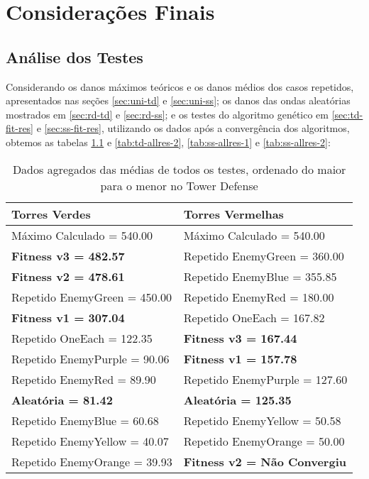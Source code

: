 \chapter{Considerações Finais}
\label{cap:consideracoes}

\section{Análise dos Testes}
\label{sec:analise-testes}

Considerando os danos máximos teóricos e os danos médios dos casos repetidos, apresentados nas seções \ref{sec:uni-td} e \ref{sec:uni-ss}; os danos das ondas aleatórias mostrados em \ref{sec:rd-td} e \ref{sec:rd-ss}; e os testes do algoritmo genético em \ref{sec:td-fit-res} e \ref{sec:ss-fit-res}, utilizando os dados após a convergência dos algoritmos, obtemos as tabelas \ref{tab:td-allres-1} e \ref{tab:td-allres-2}, \ref{tab:ss-allres-1} e \ref{tab:ss-allres-2}:

\pagebreak

\begin{table}[H]
\centering
\begin{tabular}{l|l}
Torres Verdes                & Torres Vermelhas                    \\ \hline
Máximo Calculado = 540.00    & Máximo Calculado = 540.00           \\
\textbf{Fitness v3 = 482.57} & Repetido EnemyGreen = 360.00        \\
\textbf{Fitness v2 = 478.61} & Repetido EnemyBlue = 355.85         \\
Repetido EnemyGreen = 450.00 & Repetido EnemyRed = 180.00          \\
\textbf{Fitness v1 = 307.04} & Repetido OneEach = 167.82           \\
Repetido OneEach = 122.35    & \textbf{Fitness v3 = 167.44}        \\
Repetido EnemyPurple = 90.06 & \textbf{Fitness v1 = 157.78}        \\
Repetido EnemyRed = 89.90    & Repetido EnemyPurple = 127.60       \\
\textbf{Aleatória = 81.42}   & \textbf{Aleatória = 125.35}         \\
Repetido EnemyBlue = 60.68   & Repetido EnemyYellow = 50.58        \\
Repetido EnemyYellow = 40.07 & Repetido EnemyOrange = 50.00        \\
Repetido EnemyOrange = 39.93 & \textbf{Fitness v2 = Não Convergiu}
\end{tabular}
\caption{Dados agregados das médias de todos os testes, ordenado do maior para o menor no Tower Defense}
\label{tab:td-allres-1}
\end{table}

